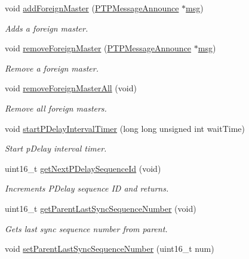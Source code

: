 \begin{DoxyCompactItemize}
void \hyperlink{class_ether_port_a3176217b13246c63fa4987e0ce0db149}{add\+Foreign\+Master} (\hyperlink{class_p_t_p_message_announce}{P\+T\+P\+Message\+Announce} $\ast$\hyperlink{openavb__log_8c_a0c7e58a50354c4a4d6dad428d0e47029}{msg})
\begin{DoxyCompactList}\small\item\em Adds a foreign master. \end{DoxyCompactList}\item 
void \hyperlink{class_ether_port_acd1c1bf1471198e12a9ebe3496a8e9dc}{remove\+Foreign\+Master} (\hyperlink{class_p_t_p_message_announce}{P\+T\+P\+Message\+Announce} $\ast$\hyperlink{openavb__log_8c_a0c7e58a50354c4a4d6dad428d0e47029}{msg})
\begin{DoxyCompactList}\small\item\em Remove a foreign master. \end{DoxyCompactList}\item 
void \hyperlink{class_ether_port_ad78513a360e8accfa86b24cee34725d1}{remove\+Foreign\+Master\+All} (void)
\begin{DoxyCompactList}\small\item\em Remove all foreign masters. \end{DoxyCompactList}\item 
void \hyperlink{class_ether_port_a970788fa9557f7bd8f8c91ee9e9bcb11}{start\+P\+Delay\+Interval\+Timer} (long long unsigned int wait\+Time)
\begin{DoxyCompactList}\small\item\em Start p\+Delay interval timer. \end{DoxyCompactList}\item 
uint16\+\_\+t \hyperlink{class_ether_port_ad4d3c20d73787e5a738985f6f2ccda59}{get\+Next\+P\+Delay\+Sequence\+Id} (void)
\begin{DoxyCompactList}\small\item\em Increments P\+Delay sequence ID and returns. \end{DoxyCompactList}\item 
uint16\+\_\+t \hyperlink{class_ether_port_a309b5999e389c2c63a6032acdd8f3a9b}{get\+Parent\+Last\+Sync\+Sequence\+Number} (void)
\begin{DoxyCompactList}\small\item\em Gets last sync sequence number from parent. \end{DoxyCompactList}\item 
void \hyperlink{class_ether_port_a28bf1e013d3f79704f09fe9fb0027d01}{set\+Parent\+Last\+Sync\+Sequence\+Number} (uint16\+\_\+t num)

\end{DoxyCompactItemize}

